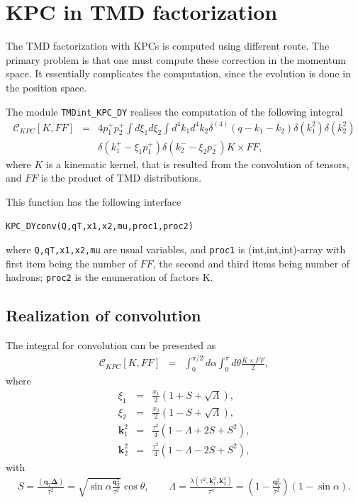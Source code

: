\documentclass[prd,nofootinbib,eqsecnum,final]{revtex4}
\renewcommand{\(}{\left(}
\renewcommand{\)}{\right)}
\renewcommand{\[}{\left[}
\renewcommand{\]}{\right]}
\renewcommand{\vec}[1]{\bm{#1}}
\begin{document}
\newpage

\section{KPC in TMD factorization}

The TMD factorization with KPCs is computed using different route. The primary problem is that one must compute these correction in the momentum space. It essentially complicates the computation, since the evolution is done in the position space. 

The module \texttt{TMDint\_KPC\_DY} realises the computation of the following integral
\begin{eqnarray}
\mathcal{C}_{KPC}[K,FF]&=&4p_1^+p_2^+\int d\xi_1 d\xi_2 \int d^4k_1 d^4k_2 \delta^{(4)}(q-k_1-k_2)\delta(k_1^2)\delta(k_2^2)
\\ &&\delta(k_1^+-\xi_1 p_1^+)\delta(k_2^--\xi_2 p_2^-)K \times FF,
\end{eqnarray}
where $K$ is a kinematic kernel, that is resulted from the convolution of tensors, and $FF$ is the product of TMD distributions.

This function has the following interface
\begin{center}
\texttt{KPC\_DYconv(Q,qT,x1,x2,mu,proc1,proc2)}
\end{center}
where \texttt{Q,qT,x1,x2,mu} are usual variables, and \texttt{proc1} is (int,int,int)-array with first item being the number of $FF$, the second and third items being number of hadrons; \texttt{proc2} is the enumeration of factors K.

\subsection{Realization of convolution}

The integral for convolution can be presented as
\begin{eqnarray}
\mathcal{C}_{KPC}[K,FF]&=&
\int_{0}^{\pi/2}d\alpha \int_0^{\pi}d\theta  \frac{K \times FF }{2},
\end{eqnarray}
where 
\begin{eqnarray}
\xi_1&=&\frac{x_1}{2}\(1+S+\sqrt{\Lambda}\),
\\
\xi_2&=&\frac{x_2}{2}\(1-S+\sqrt{\Lambda}\),
\\
\vec k_1^2&=&\frac{\tau^2}{4}\(1-\Lambda+2S+S^2\),
\\
\vec k_2^2&=&\frac{\tau^2}{4}\(1-\Lambda-2S+S^2\),
\end{eqnarray}
with
\begin{eqnarray}
S=\frac{(\vec q_T\vec \Delta)}{\tau^2}=\sqrt{\sin \alpha \frac{\vec q_T^2}{\tau^2}}\cos\theta,\qquad \Lambda=\frac{\lambda(\tau^2,\vec k_1^2,\vec k_2^2)}{\tau^4}=\(1-\frac{\vec q_T^2}{\tau^2}\)\(1-\sin\alpha\).
\end{eqnarray}
\end{document}
